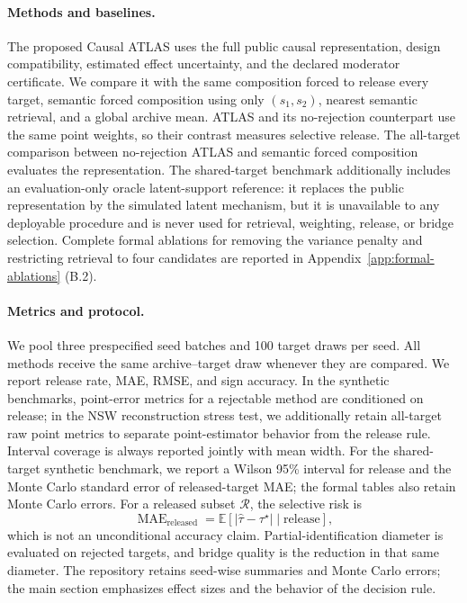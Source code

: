 \documentclass[11pt]{article}
\numberwithin{equation}{section}
\newcommand{\1}{\mathbf 1}
\newcommand{\abs}[1]{\left\lvert #1\right\rvert}
\begin{document}
\paragraph{Methods and baselines.}
The proposed Causal ATLAS uses the full public causal representation, design compatibility, estimated effect uncertainty, and the declared moderator certificate.  We compare it with the same composition forced to release every target, semantic forced composition using only $(s_1,s_2)$, nearest semantic retrieval, and a global archive mean.  ATLAS and its no-rejection counterpart use the same point weights, so their contrast measures selective release.  The all-target comparison between no-rejection ATLAS and semantic forced composition evaluates the representation.  The shared-target benchmark additionally includes an evaluation-only oracle latent-support reference: it replaces the public representation by the simulated latent mechanism, but it is unavailable to any deployable procedure and is never used for retrieval, weighting, release, or bridge selection.  Complete formal ablations for removing the variance penalty and restricting retrieval to four candidates are reported in Appendix~\ref{app:formal-ablations} (B.2).

\paragraph{Metrics and protocol.}
We pool three prespecified seed batches and 100 target draws per seed.  All methods receive the same archive--target draw whenever they are compared.  We report release rate, MAE, RMSE, and sign accuracy.  In the synthetic benchmarks, point-error metrics for a rejectable method are conditioned on release; in the NSW reconstruction stress test, we additionally retain all-target raw point metrics to separate point-estimator behavior from the release rule.  Interval coverage is always reported jointly with mean width.  For the shared-target synthetic benchmark, we report a Wilson 95\% interval for release and the Monte Carlo standard error of released-target MAE; the formal tables also retain Monte Carlo errors.  For a released subset $\mathcal R$, the selective risk is
\[
\operatorname{MAE}_{\mathrm{released}}
 =\mathbb E\!\left[\abs{\widehat\tau-\tau^\star}\mid \text{release}\right],
\]
which is not an unconditional accuracy claim.  Partial-identification diameter is evaluated on rejected targets, and bridge quality is the reduction in that same diameter.  The repository retains seed-wise summaries and Monte Carlo errors; the main section emphasizes effect sizes and the behavior of the decision rule.
\end{document}
